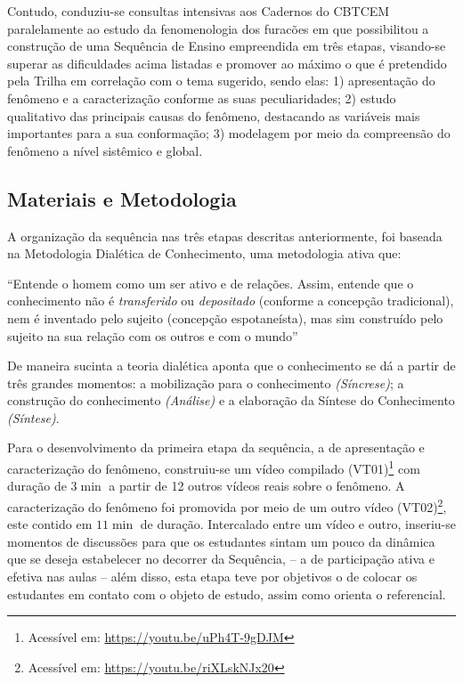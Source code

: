 Contudo, conduziu-se consultas intensivas aos Cadernos do \ac{CBTCEM} paralelamente ao estudo da fenomenologia dos furacões em que possibilitou a construção de uma Sequência de Ensino empreendida em três etapas, visando-se superar as dificuldades acima listadas e promover ao máximo o que é pretendido pela Trilha em correlação com o tema sugerido, sendo elas: 1) apresentação do fenômeno e a caracterização conforme as suas peculiaridades; 2) estudo qualitativo das principais causas do fenômeno, destacando as variáveis mais importantes para a sua conformação; 3) modelagem por meio da compreensão do fenômeno a nível sistêmico e global. 
\subsection{Materiais e Metodologia} %
\label{sub:Materiais e Metodologia}
A organização da sequência nas três etapas descritas anteriormente, foi baseada na Metodologia Dialética de Conhecimento, uma metodologia ativa que:

\begin{citacao}
	``Entende o homem como um ser ativo e de relações. Assim, entende que o conhecimento não é \textit{transferido} ou \textit{depositado} (conforme a concepção tradicional), nem é inventado pelo sujeito (concepção espotaneísta), mas sim construído pelo sujeito na sua relação com os outros e com o mundo'' \cite[pp.~2]{VASCONCELLOS:1992}
\end{citacao}
De maneira sucinta a teoria dialética aponta que o conhecimento se dá a partir de três grandes momentos: a mobilização para o conhecimento \textit{(Síncrese)}; a construção do conhecimento \textit{(Análise)} e a elaboração da Síntese do Conhecimento \textit{(Síntese)}.

Para o desenvolvimento da primeira etapa da sequência, a de apresentação e caracterização do fenômeno, construiu-se um vídeo compilado (VT01)\footnote{Acessível em: \url{https://youtu.be/uPh4T-9gDJM}} com duração de $3\min$ a partir de 12 outros vídeos reais sobre o fenômeno. A caracterização do fenômeno foi promovida por meio de um outro vídeo (VT02)\footnote{Acessível em: \url{https://youtu.be/riXLskNJx20}}, este contido em $11\min$ de duração. Intercalado entre um vídeo e outro, inseriu-se momentos de discussões para que os estudantes sintam um pouco da dinâmica que se deseja estabelecer no decorrer da Sequência, -- a de participação ativa e efetiva nas aulas -- além disso, esta etapa teve por objetivos o de colocar os estudantes em contato com o objeto de estudo, assim como orienta o referencial.

